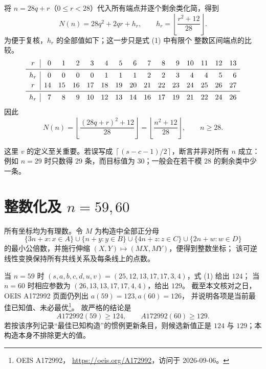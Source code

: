 \documentclass[11pt,a4paper]{ctexart}
\newcommand{\floor}[1]{\left\lfloor #1\right\rfloor}
\newcommand{\ceil}[1]{\left\lceil #1\right\rceil}
\begin{document}
将 $n=28q+r$（$0\le r<28$）代入所有端点并逐个剩余类化简，得到
\[
 N(n)=28q^2+2qr+h_r,\qquad h_r=\floor{\frac{r^2+12}{28}}.
\]
为便于复核，$h_r$ 的全部值如下；这一步只是式 (1) 中有限个
整数区间端点的比较。
\begingroup\scriptsize
\[
\begin{array}{c|rrrrrrrrrrrrrr}
r&0&1&2&3&4&5&6&7&8&9&10&11&12&13\\ \midrule
h_r&0&0&0&0&1&1&1&2&2&3&4&4&5&6\\[2pt]
r&14&15&16&17&18&19&20&21&22&23&24&25&26&27\\ \midrule
h_r&7&8&9&10&12&13&14&16&17&19&21&22&24&26
\end{array}
\]
\endgroup
因此
\[
 N(n)=\floor{\frac{(28q+r)^2+12}{28}}
      =\floor{\frac{n^2+12}{28}},\qquad n\ge 28.
\]

这里 $v$ 的定义至关重要。若误写成
$\ceil{(s-c-1)/2}$，断言并非对所有 $n$ 成立：例如 $n=29$ 时只数得
$29$ 条，而目标值为 $30$；一般会在若干模 $28$ 的剩余类中少一条。

\section*{整数化及 $n=59,60$}
所有坐标均为有理数。令 $M$ 为构造中全部正分母
\[
 \{3n+x:x\in A\}\cup\{n+y:y\in B\}\cup
 \{4n+z:z\in C\}\cup\{2n+w:w\in D\}
\]
的最小公倍数，并施行伸缩 $(X,Y)\mapsto(MX,MY)$，便得到整数坐标；
该可逆线性变换保持所有共线关系及每条线上的点数。

当 $n=59$ 时
$(s,a,b,c,d,u,v)=(25,12,13,17,17,3,4)$，式 (1) 给出 $124$；
当 $n=60$ 时相应参数为 $(26,13,13,17,17,4,4)$，给出 $129$。
截至本文核对之日，OEIS A172992 页面仍列出 $a(59)=123,a(60)=126$，
并说明各项是当前最佳已知值、未必最优\footnote{OEIS A172992，
\url{https://oeis.org/A172992}，访问于 2026-09-06。}。
故严格的结论是
\[
 A172992(59)\ge124,\qquad A172992(60)\ge129.
\]
若按该序列记录“最佳已知构造”的惯例更新条目，则候选新值正是
$124$ 与 $129$；本构造本身不排除更大的值。
\end{document}
